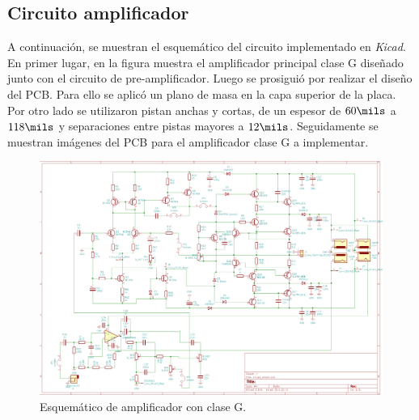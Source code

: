 \subsection{Circuito amplificador}


\par A continuación, se muestran el esquemático del circuito implementado en \textit{Kicad}. En primer lugar, en la figura  muestra el amplificador principal clase G diseñado junto con el circuito de pre-amplificador. Luego se prosiguió por realizar el diseño del PCB. Para ello se aplicó un plano de masa en la capa superior de la placa. Por otro lado se utilizaron pistan anchas y cortas, de un espesor de $60 \si[per-mode=symbol]{\mils}$ a $118 \si[per-mode=symbol]{\mils}$ y separaciones entre pistas mayores a $12 \si[per-mode=symbol]{\mils}$. Seguidamente se muestran imágenes del PCB para el amplificador clase G a implementar.\\


\vfill

\clearpage



\begin{figure}[H]
        \centering
        \includegraphics[height=0.8 \textwidth, angle=90]{img/circuito/kicad.png}
        \caption{Esquemático de amplificador con clase G.}
        \label{fig::ampli_kicad}
\end{figure}

